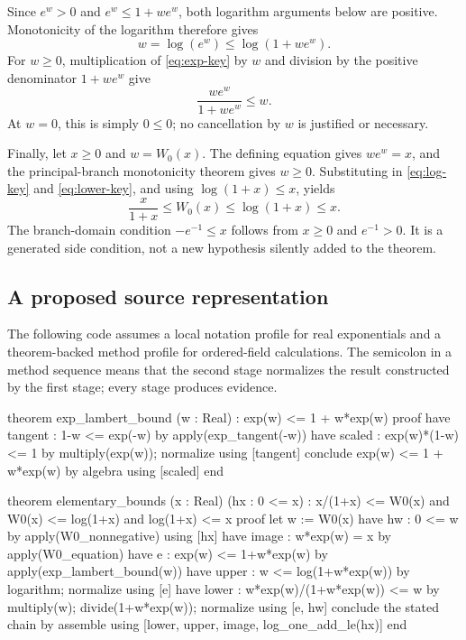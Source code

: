 \documentclass[11pt,a4paper]{article}
\begin{document}
Since $e^w>0$ and $e^w\le1+w e^w$, both logarithm arguments below are positive. Monotonicity of the logarithm therefore gives
\begin{equation}
 w=\log(e^w)\le\log(1+w e^w).
 \label{eq:log-key}
\end{equation}
For $w\ge0$, multiplication of \eqref{eq:exp-key} by $w$ and division by the positive denominator $1+w e^w$ give
\begin{equation}
 \frac{w e^w}{1+w e^w}\le w.
 \label{eq:lower-key}
\end{equation}
At $w=0$, this is simply $0\le0$; no cancellation by $w$ is justified or necessary.

Finally, let $x\ge0$ and $w=W_0(x)$. The defining equation gives $w e^w=x$, and the principal-branch monotonicity theorem gives $w\ge0$. Substituting in \eqref{eq:log-key} and \eqref{eq:lower-key}, and using $\log(1+x)\le x$, yields
\[
 \boxed{\frac{x}{1+x}\le W_0(x)\le\log(1+x)\le x.}
\]
The branch-domain condition $-e^{-1}\le x$ follows from $x\ge0$ and $e^{-1}>0$. It is a generated side condition, not a new hypothesis silently added to the theorem.

\subsection{A proposed source representation}

The following code assumes a local notation profile for real exponentials and a theorem-backed method profile for ordered-field calculations. The semicolon in a method sequence means that the second stage normalizes the result constructed by the first stage; every stage produces evidence.

\par\noindent\begin{minipage}{\linewidth}
\begin{rawcode}
theorem exp_lambert_bound (w : Real) :
    exp(w) <= 1 + w*exp(w)
proof
  have tangent : 1-w <= exp(-w)
    by apply(exp_tangent(-w))
  have scaled : exp(w)*(1-w) <= 1
    by multiply(exp(w)); normalize using [tangent]
  conclude exp(w) <= 1 + w*exp(w)
    by algebra using [scaled]
end

theorem elementary_bounds (x : Real) (hx : 0 <= x) :
    x/(1+x) <= W0(x) and
    W0(x) <= log(1+x) and log(1+x) <= x
proof
  let w := W0(x)
  have hw : 0 <= w by apply(W0_nonnegative) using [hx]
  have image : w*exp(w) = x by apply(W0_equation)
  have e : exp(w) <= 1+w*exp(w)
    by apply(exp_lambert_bound(w))
  have upper : w <= log(1+w*exp(w))
    by logarithm; normalize using [e]
  have lower : w*exp(w)/(1+w*exp(w)) <= w
    by multiply(w); divide(1+w*exp(w)); normalize
       using [e, hw]
  conclude the stated chain
    by assemble using [lower, upper, image, log_one_add_le(hx)]
end
\end{rawcode}
\end{minipage}\par
\end{document}
